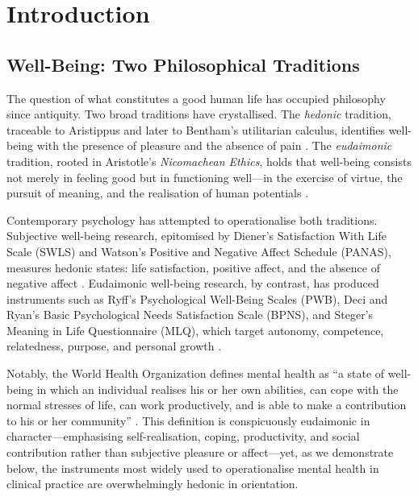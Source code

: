 \documentclass[12pt,a4paper]{article}
\begin{document}
\newpage
\tableofcontents
\newpage

\section{Introduction}\label{sec:introduction}

\subsection{Well-Being: Two Philosophical Traditions}

The question of what constitutes a good human life has occupied philosophy since antiquity.
Two broad traditions have crystallised.
The \textit{hedonic} tradition, traceable to Aristippus and later to Bentham's utilitarian calculus, identifies well-being with the presence of pleasure and the absence of pain
\citep{kahneman1999hedonic, diener1984subjective}.
The \textit{eudaimonic} tradition, rooted in Aristotle's \textit{Nicomachean Ethics}, holds that well-being consists not merely in feeling good but in functioning well---in the exercise of virtue, the pursuit of meaning, and the realisation of human potentials
\citep{ryan2001happiness, waterman1993eudaimonia, aristotle1999nicomachean}.

Contemporary psychology has attempted to operationalise both traditions.
Subjective well-being research, epitomised by Diener's Satisfaction With Life Scale (SWLS)
and Watson's Positive and Negative Affect Schedule (PANAS), measures hedonic states:
life satisfaction, positive affect, and the absence of negative affect
\citep{diener1985satisfaction, watson1988panas}.
Eudaimonic well-being research, by contrast, has produced instruments such as Ryff's Psychological Well-Being Scales (PWB), Deci and Ryan's Basic Psychological Needs Satisfaction Scale (BPNS), and Steger's Meaning in Life Questionnaire (MLQ), which target autonomy, competence, relatedness, purpose, and personal growth
\citep{ryff1989happiness, deci2000self, steger2006meaning}.

Notably, the World Health Organization defines mental health as ``a state of well-being in which an individual realises his or her own abilities, can cope with the normal stresses of life, can work productively, and is able to make a contribution to his or her community'' \citep{who2004mental}.
This definition is conspicuously eudaimonic in character---emphasising self-realisation, coping, productivity, and social contribution rather than subjective pleasure or affect---yet, as we demonstrate below, the instruments most widely used to operationalise mental health in clinical practice are overwhelmingly hedonic in orientation.
\end{document}
